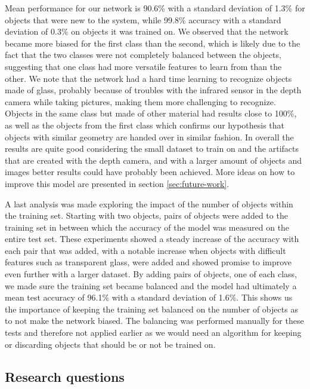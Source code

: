 Mean performance for our network is 90.6\% with a standard deviation of 1.3\% for objects that were new to the system, while 99.8\% accuracy with a standard deviation of 0.3\% on objects it was trained on. We observed that the network became more biased for the first class than the second, which is likely due to the fact that the two classes were not completely balanced between the objects, suggesting that one class had more versatile features to learn from than the other. We note that the network had a hard time learning to recognize objects made of glass, probably because of troubles with the infrared sensor in the depth camera while taking pictures, making them more challenging to recognize. Objects in the same class but made of other material had results close to 100\%, as well as the objects from the first class which confirms our hypothesis that objects with similar geometry are handed over in similar fashion. In overall the results are quite good considering the small dataset to train on and the artifacts that are created with the depth camera, and with a larger amount of objects and images better results could have probably been achieved. More ideas on how to improve this model are presented in section \ref{sec:future-work}.

A last analysis was made exploring the impact of the number of objects within the training set. Starting with two objects, pairs of objects were added to the training set in between which the accuracy of the model was measured on the entire test set. These experiments showed a steady increase of the accuracy with each pair that was added, with a notable increase when objects with difficult features such as transparent glass, were added and showed promise to improve even further with a larger dataset. By adding pairs of objects, one of each class, we made sure the training set became balanced and the model had ultimately a mean test accuracy of 96.1\% with a standard deviation of 1.6\%. This shows us the importance of keeping the training set balanced on the number of objects as to not make the network biased. The balancing was performed manually for these tests and therefore not applied earlier as we would need an algorithm for keeping or discarding objects that should be or not be trained on.



\subsection{Research questions}

